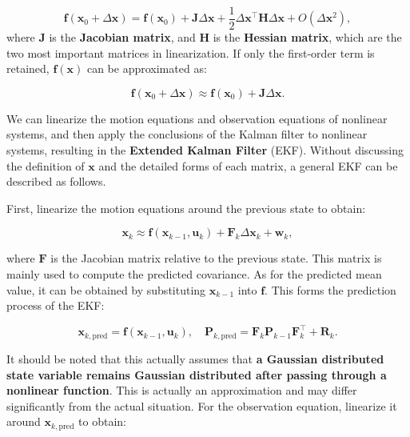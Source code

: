 \begin{equation}
	\mathbf{f} (\mathbf{x}_0 + \Delta \mathbf{x}) = \mathbf{f} (\mathbf{x}_0) + \mathbf{J} \Delta \mathbf{x} + \frac{1}{2} \Delta \mathbf{x} ^\top \mathbf{H} \Delta \mathbf{x} + O(\Delta \mathbf{x}^2),
\end{equation}
where $\mathbf{J}$ is the \textbf{Jacobian matrix}, and $\mathbf{H}$ is the \textbf{Hessian matrix}, which are the two most important matrices in linearization. If only the first-order term is retained, $\mathbf{f}(\mathbf{x})$ can be approximated as:

\begin{equation}
	\mathbf{f} (\mathbf{x}_0 + \Delta \mathbf{x}) \approx \mathbf{f} (\mathbf{x}_0) + \mathbf{J} \Delta \mathbf{x}.
\end{equation}

We can linearize the motion equations and observation equations of nonlinear systems, and then apply the conclusions of the Kalman filter to nonlinear systems, resulting in the \textbf{Extended Kalman Filter} (EKF). Without discussing the definition of $\mathbf{x}$ and the detailed forms of each matrix, a general EKF can be described as follows.

First, linearize the motion equations around the previous state to obtain:

\begin{equation}
	\mathbf{x}_k \approx \mathbf{f}(\mathbf{x}_{k-1}, \mathbf{u}_k) + \mathbf{F}_k \Delta \mathbf{x}_k + \mathbf{w}_k,
\end{equation}

where $\mathbf{F}$ is the Jacobian matrix relative to the previous state. This matrix is mainly used to compute the predicted covariance. As for the predicted mean value, it can be obtained by substituting $\mathbf{x}_{k-1}$ into $\mathbf{f}$. This forms the prediction process of the EKF:

\begin{mdframed}
\begin{equation}
\mathbf{x}_{k, \text{pred}} = \mathbf{f}(\mathbf{x}_{k-1}, \mathbf{u}_k), \quad \mathbf{P}_{k, \text{pred}} = \mathbf{F}_k \mathbf{P}_{k-1} \mathbf{F}_k^\top + \mathbf{R}_k.
\end{equation}
\end{mdframed}

It should be noted that this actually assumes that \textbf{a Gaussian distributed state variable remains Gaussian distributed after passing through a nonlinear function}. This is actually an approximation and may differ significantly from the actual situation. For the observation equation, linearize it around $\mathbf{x}_{k, \text{pred}}$ to obtain:

